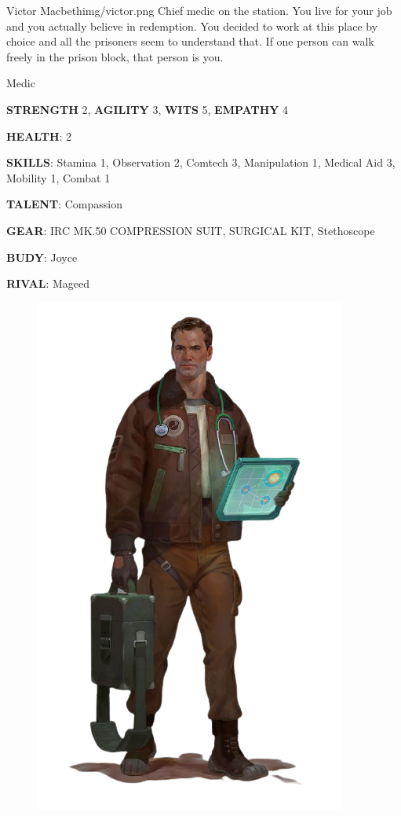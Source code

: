 \clearpage


\begin{rpg-pcbox}{Victor Macbeth}{img/victor.png}
    Chief medic on the station. You live for your job and you actually believe in redemption. You decided to work at this place by choice and all the prisoners seem to understand that. If one person can walk freely in the prison block, that person is you.
\end{rpg-pcbox}

\begin{rpg-commentbox}{}
    Medic

    \textbf{STRENGTH} 2, \textbf{AGILITY} 3, \textbf{WITS} 5, \textbf{EMPATHY} 4

    \textbf{HEALTH}: 2

    \textbf{SKILLS}: Stamina 1, Observation 2, Comtech 3, Manipulation 1, Medical Aid 3, Mobility 1, Combat 1
    
    \textbf{TALENT}: Compassion
    
    \textbf{GEAR}: IRC MK.50 COMPRESSION SUIT, SURGICAL KIT, Stethoscope

    
    \textbf{BUDY}: Joyce
    
    \textbf{RIVAL}: Mageed
\end{rpg-commentbox}



\begin{figure}
    \hspace*{-1in}
    \includegraphics[width=.70\textwidth]{img/bg/medic.png}
    \label{fig:refinery}
\end{figure}